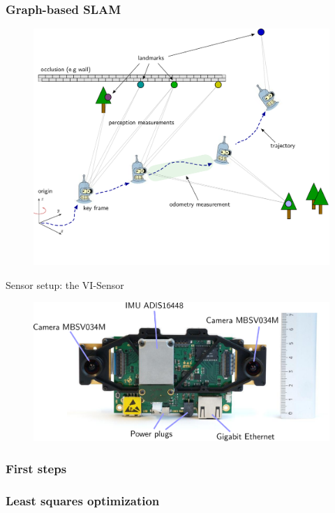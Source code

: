 \documentclass[11pt]{beamer}
\begin{document}
\begin{frame}
\frametitle{Graph-based SLAM}
\begin{figure}[!htb]
\centering
\includegraphics[height=0.925\textheight]{figures/approach_fundamentals/overview_graphslam_simplified.pdf}
\end{figure}
\end{frame}

\begin{frame}{Sensor setup: the VI-Sensor}
\begin{figure}[!htb]
\centering
\includegraphics[width=\textwidth]{figures/introduction/vi_sensor_details.pdf}
\end{figure}
\end{frame}

\begin{frame}
\frametitle{First steps}
\end{frame}

\begin{frame}
\frametitle{Least squares optimization}
\end{frame}
\end{document}
